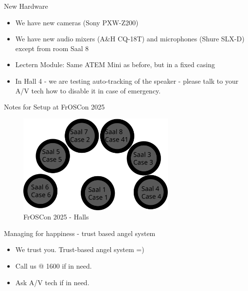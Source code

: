 
\begin{frame}{New Hardware}
	\begin{itemize}
		\item We have new cameras (Sony PXW-Z200)
		\item We have new audio mixers (A\&H CQ-18T) and microphones (Shure SLX-D) except from room Saal 8
		\item Lectern Module: Same ATEM Mini as before, but in a fixed casing
		\item In Hall 4 - we are testing auto-tracking of the speaker - please talk to your A/V tech how to disable it in case of emergency.
	\end{itemize}
\end{frame}

\begin{frame}{Notes for Setup at FrOSCon 2025}
       \begin{figure}
                \centering
	        \includegraphics[width=0.7\textwidth]{images/froscon-saal-setup.png}
	        \caption{FrOSCon 2025 - Halls}
       \end{figure}
\end{frame}

\begin{frame}{Managing for happiness - trust based angel system}
	\begin{itemize}
		\item We trust you. Trust-based angel system =)
	        \item Call us @ 1600 if in need.
		\item Ask A/V tech if in need.
	\end{itemize}
\end{frame}

